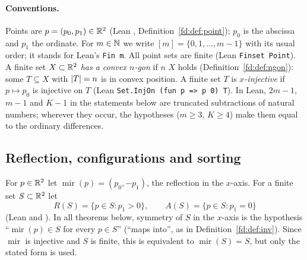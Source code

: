 \paragraph{Conventions.}
Points are $p=(p_0,p_1)\in\mathbb R^2$ (Lean , Definition~\ref{fd:def:point}); $p_0$ is the abscissa
and $p_1$ the ordinate. For $m\in\mathbb N$ we write $[m]=\{0,1,\dots,m-1\}$ with its usual order; it stands for
Lean's \texttt{Fin m}. All point sets are finite (Lean \texttt{Finset Point}). A finite set $X\subset\mathbb R^2$
\emph{has a convex $n$-gon} if  $n$ $X$ holds (Definition~\ref{fd:def:ngon}): some
$T\subseteq X$ with $\lvert T\rvert=n$ is in convex position. A finite set $T$ is \emph{$x$-injective} if
$p\mapsto p_0$ is injective on $T$ (Lean \texttt{Set.InjOn (fun p => p 0) T}). In Lean, $2m-1$, $m-1$
and $K-1$ in the statements below are truncated subtractions of natural numbers; wherever they occur,
the hypotheses ($m\ge3$, $K\ge4$) make them equal to the ordinary differences.

\subsection{Reflection, configurations and sorting}

\begin{definition}\label{mm:def:mir}
For $p\in\mathbb R^2$ let $\operatorname{mir}(p)=(p_0,-p_1)$, the reflection in the $x$-axis. For a finite set
$S\subset\mathbb R^2$ let
\[ R(S)=\{p\in S: p_1>0\},\qquad A(S)=\{p\in S: p_1=0\} \]
(Lean  and ). In all theorems below, symmetry of $S$ in the $x$-axis is the
hypothesis ``$\operatorname{mir}(p)\in S$ for every $p\in S$'' (``maps into'', as in
Definition~\ref{fd:def:inv}). Since $\operatorname{mir}$ is injective and $S$ is finite, this is
equivalent to $\operatorname{mir}(S)=S$, but only the stated form is used.
\end{definition}

